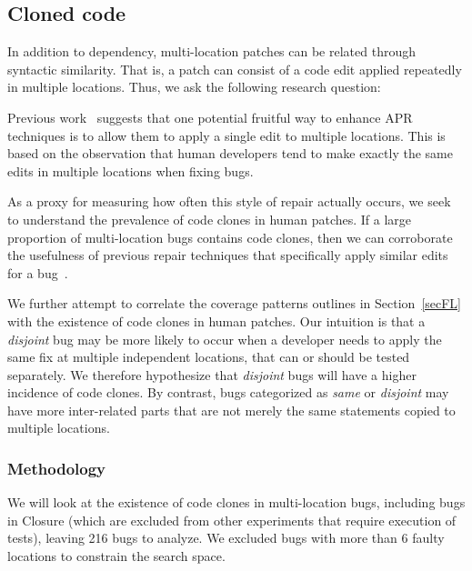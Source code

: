 \documentclass[sigconf, timestamp-false, anonymous=true]{acmart}
\begin{document}
\subsection{Cloned code}

In addition to dependency, multi-location patches can be related through syntactic
similarity. That is, a patch can consist of a code edit applied repeatedly in
multiple locations. Thus, we ask the following research question:


Previous work~\cite{wang2018} suggests that one potential fruitful way to enhance
APR techniques is to allow them to apply a single edit to multiple locations.
This is based on the observation that human developers tend to make exactly the 
same edits in multiple locations when fixing bugs. 

As a proxy for measuring how often this style of repair actually occurs, we seek
to understand the 
prevalence of code clones in human patches. If a large proportion of multi-location bugs contains code 
clones, then we can corroborate the usefulness of previous repair techniques that specifically apply 
similar 
edits for a bug~\cite{saha2019harnessing}.

We further attempt to correlate the coverage patterns outlines in
Section~\ref{secFL} with the existence of code clones in human patches.  Our 
intuition is that a \emph{disjoint} bug may be more likely to occur when a
developer needs to apply the same fix at multiple independent locations, that
can or should be tested separately.  We therefore 
 hypothesize that \emph{disjoint} bugs will have a higher incidence of code
clones. By contrast, bugs categorized as \emph{same} or \emph{disjoint} may have
more inter-related parts that are not merely the same statements copied to
multiple locations.


\subsubsection{Methodology}
\label{sec52}
We will look at the existence of code clones in multi-location bugs, including bugs in Closure (which are 
excluded from other experiments that require execution of tests), leaving 216 bugs to analyze. We 
excluded bugs with more than 6 faulty locations to constrain the search space.
\end{document}
